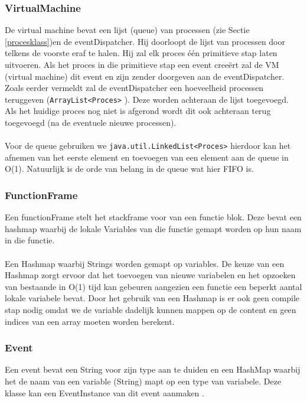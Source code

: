 \documentclass[]{article}
\begin{document}
\subsubsection{VirtualMachine}
\label{VMClass}
De virtual machine bevat een lijst (queue) van processen (zie Sectie \ref{procesklass})en de eventDispatcher. Hij doorloopt de lijst van processen door telkens de voorste eraf te halen. Hij zal elk proces \'{e}\'{e}n primitieve stap laten uitvoeren. Als het proces in die primitieve stap een event cree\"{e}rt zal de VM (virtual machine) dit event en zijn zender doorgeven aan de eventDispatcher. Zoals eerder vermeldt zal de eventDispatcher een hoeveelheid processen teruggeven (\texttt{ArrayList<Proces>} \cite{arraylist}). Deze worden achteraan de lijst toegevoegd. Als het huidige proces nog niet is afgerond wordt dit ook achteraan terug toegevoegd (na de eventuele nieuwe processen).\\\\
Voor de queue gebruiken we \texttt{java.util.LinkedList<Proces>} \cite{linkedlist} hierdoor kan het afnemen van het eerste element en toevoegen van een element aan de queue in O(1). Natuurlijk is de orde van belang in de queue wat hier FIFO is.\\
\subsubsection{FunctionFrame}
\label{functionframe}
Een functionFrame stelt het stackframe voor van een functie blok. Deze bevat een hashmap \cite{hashmap} waarbij
de lokale Variables van die functie gemapt worden op hun naam in die functie.\\\\
Een Hashmap waarbij Strings worden gemapt op variables. De keuze van een Hashmap zorgt ervoor dat het toevoegen van nieuwe variabelen en het opzoeken van bestaande in O(1) tijd kan gebeuren aangezien een functie een beperkt aantal lokale variabele bevat. Door het gebruik van een Hashmap is er ook geen compile stap nodig omdat we de variable dadelijk kunnen mappen op de content en geen indices van een array moeten worden berekent.\cite{hashmap}
\subsubsection{Event}
Een event bevat een String voor zijn type aan te duiden en een HashMap waarbij het de naam van een variable (String) mapt op een type van variabele. Deze klasse kan een EventInstance van dit event aanmaken \cite{hashmap}.
\end{document}
